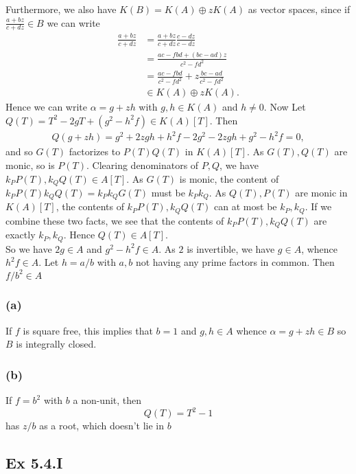 \documentclass{article}
\theoremstyle{definition}
\begin{document}
Furthermore, we also have $K(B) = K(A) \oplus z K(A)$ as vector spaces, since 
if $\frac{a + b z}{c + d z} \in B$ we can write 
\begin{align*}
	\frac{a + b z}{c + d z}
	&=
	\frac{a + b z}{c + d z}
	\frac{c - d z}{c - d z} \\
	&=
	\frac{ac - f bd + (bc - ad) z}{c^2 - f d^2} \\
	&=
	\frac{ac - f bd}{c^2 - f d^2}
	+
	z \frac{bc - ad}{c^2 - f d^2} \\
	&\in K(A) \oplus z K(A).
\end{align*} 
Hence we can write $\alpha = g + z h$ with $g, h \in K(A)$ and $h \not = 0$.
Now Let $Q(T) = T^2 - 2gT + (g^2 - h^2 f) \in K(A)[T]$. Then 
\begin{align*}
	Q(g + z h)
	=
	g^2 + 2 z gh + h^2 f
	-
	2 g^2 - 2 z gh
	+ g^2 - h^2 f
	= 0,
\end{align*}
and so $G(T)$ factorizes to $P(T)Q(T)$ in $K(A)[T]$. As $G(T), Q(T)$ are monic,
so is $P(T)$. Clearing denominators of $P, Q$, we have $k_P P(T), k_Q Q(T) \in
A[T]$. As $G(T)$ is monic, the content of $k_P P(T) k_Q Q(T) = k_P k_Q G(T)$
must be $k_P k_Q$. As $Q(T), P(T)$ are monic in $K(A)[T]$, the contents of $k_P
P(T), k_Q Q(T)$ can at most be $k_P, k_Q$. If we combine these two facts, we
see that the contents of $k_P P(T), k_Q Q(T)$ are exactly $k_P, k_Q$. Hence
$Q(T) \in A[T]$. \\

So we have $2g \in A$ and $g^2 - h^2 f \in A$. As $2$ is invertible, we have $g \in A$,
whence $h^2 f \in A$. Let $h = a/b$ with $a, b$ not having any prime factors in common.
Then $f/b^2 \in A$

\subsubsection*{(a)}

If $f$ is square free, this implies that $b = 1$ and $g, h \in A$ whence
$\alpha = g + z h \in B$ so $B$ is integrally closed.

\subsubsection*{(b)}
If $f = b^2$ with $b$ a non-unit, then 
\[
	Q(T)
	=
	T^2
	-
	1
\] 
has $z / b$ as a root, which doesn't lie in $b$


\subsection*{Ex 5.4.I}
\end{document}
